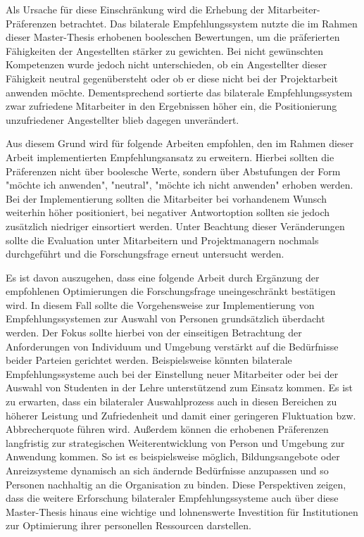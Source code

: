 Als Ursache für diese Einschränkung wird die Erhebung der Mitarbeiter-Präferenzen betrachtet. Das bilaterale Empfehlungssystem nutzte die im Rahmen dieser Master-Thesis erhobenen booleschen Bewertungen, um die präferierten Fähigkeiten der Angestellten stärker zu gewichten. Bei nicht gewünschten Kompetenzen wurde jedoch nicht unterschieden, ob ein Angestellter dieser Fähigkeit neutral gegenübersteht oder ob er diese nicht bei der Projektarbeit anwenden möchte. Dementsprechend sortierte das bilaterale Empfehlungssystem zwar zufriedene Mitarbeiter in den Ergebnissen höher ein, die Positionierung unzufriedener Angestellter blieb dagegen unverändert.

Aus diesem Grund wird für folgende Arbeiten empfohlen, den im Rahmen dieser Arbeit implementierten Empfehlungsansatz zu erweitern. Hierbei sollten die Präferenzen nicht über boolesche Werte, sondern über Abstufungen der Form "möchte ich anwenden", "neutral", "möchte ich nicht anwenden" erhoben werden. Bei der Implementierung sollten die Mitarbeiter bei vorhandenem Wunsch weiterhin höher positioniert, bei negativer Antwortoption sollten sie jedoch zusätzlich niedriger einsortiert werden. Unter Beachtung dieser Veränderungen sollte die Evaluation unter Mitarbeitern und Projektmanagern nochmals durchgeführt und die Forschungsfrage erneut untersucht werden.

Es ist davon auszugehen, dass eine folgende Arbeit durch Ergänzung der empfohlenen Optimierungen die Forschungsfrage uneingeschränkt bestätigen wird. In diesem Fall sollte die Vorgehensweise zur Implementierung von Empfehlungssystemen zur Auswahl von Personen grundsätzlich überdacht werden. Der Fokus sollte hierbei von der einseitigen Betrachtung der Anforderungen von Individuum und Umgebung verstärkt auf die Bedürfnisse beider Parteien gerichtet werden. Beispielsweise könnten bilaterale Empfehlungssysteme auch bei der Einstellung neuer Mitarbeiter oder bei der Auswahl von Studenten in der Lehre unterstützend zum Einsatz kommen. Es ist zu erwarten, dass ein bilateraler Auswahlprozess auch in diesen Bereichen zu höherer Leistung und Zufriedenheit und damit einer geringeren Fluktuation bzw. Abbrecherquote führen wird. Außerdem können die erhobenen Präferenzen langfristig zur strategischen Weiterentwicklung von Person und Umgebung zur Anwendung kommen. So ist es beispielsweise möglich, Bildungsangebote oder Anreizsysteme dynamisch an sich ändernde Bedürfnisse anzupassen und so Personen nachhaltig an die Organisation zu binden. Diese Perspektiven zeigen, dass die weitere Erforschung bilateraler Empfehlungssysteme auch über diese Master-Thesis hinaus eine wichtige und lohnenswerte Investition für Institutionen zur Optimierung ihrer personellen Ressourcen darstellen.
